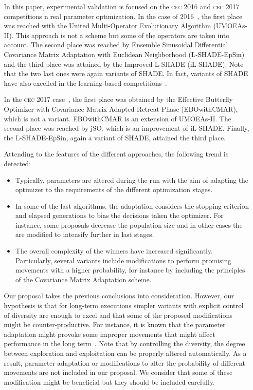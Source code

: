 In this paper, experimental validation is focused on the \textsc{cec} 2016 and \textsc{cec} 2017 competitions n real parameter optimization.
%
In the case of 2016~\cite{CEC2015}, the first place was reached with the United Multi-Operator Evolutionary Algorithm (UMOEAs-II).
%
This approach is not a \DE{} scheme but some of the \DE{} operators are taken into account.
%
The second place was reached by Ensemble Sinusoidal Differential Covariance Matrix Adaptation with Euclidean Neighborhood (L-SHADE-EpSin) 
and the third place was attained by the Improved L-SHADE (iL-SHADE).
%
Note that the two last ones were again variants of SHADE.
%
In fact, variants of SHADE have also excelled in the learning-based competitions~\cite{CEC2016_learn}.

In the \textsc{cec} 2017 case~\cite{CEC2017}, the first place was obtained by the Effective Butterfly Optimizer with Covariance 
Matrix Adapted Retreat Phase (EBOwithCMAR), which is not a \DE{} variant.
%
EBOwithCMAR is an extension of UMOEAs-II.
%
The second place was reached by jSO, which is an improvement of iL-SHADE.
%
Finally, the L-SHADE-EpSin, again a variant of SHADE, attained the third place.

Attending to the features of the different approaches, the following trend is detected:

\begin{itemize}
	\item Typically, parameters are altered during the run with the aim of adapting the optimizer to the requirements of the different optimization stages. 
	\item In some of the last algorithms, the adaptation considers the stopping criterion and elapsed generations to bias the decisions taken the optimizer.
	For instance, some proposals decrease the population size and in other cases the \DE{} are modified to intensify further in last stages.
	\item The overall complexity of the winners have increased significantly. Particularly, several variants include modifications to perform promising
	movements with a higher probability, for instance by including the principles of the Covariance Matrix Adaptation scheme.
\end{itemize}

Our proposal takes the previous conclusions into consideration.
%
However, our hypothesis is that for long-term executions simpler variants with explicit control of diversity are enough to excel and 
that some of the proposed modifications might be counter-productive.
%
For instance, it is known that the parameter adaptation might provoke some improper movements that might affect performance in the
long term~\cite{montgomery2010analysis}.
%
Note that by controlling the diversity, the degree between exploration and exploitation can be properly altered automatically.
%
As a result, parameter adaptation or modifications to alter the probability of different movements are not included in our proposal.
%
We consider that some of these modification might be beneficial but they should be included carefully.


